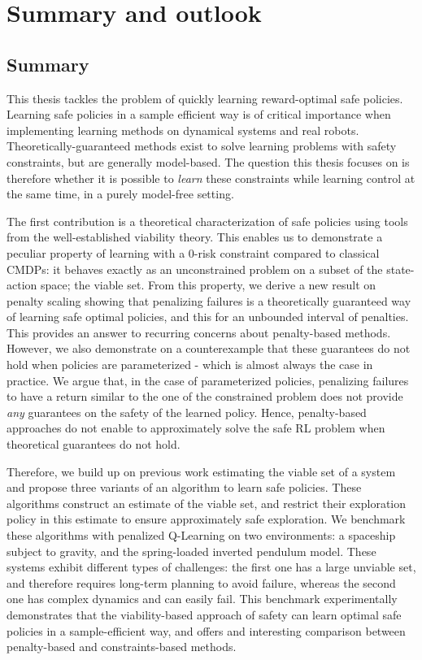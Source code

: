\chapter{Summary and outlook}

\section{Summary} \label{sec:summary}
This thesis tackles the problem of quickly learning reward-optimal safe policies. Learning safe policies in a sample efficient way is of critical importance when implementing learning methods on dynamical systems and real robots. Theoretically-guaranteed methods exist to solve learning problems with safety constraints, but are generally model-based. The question this thesis focuses on is therefore whether it is possible to\emph{ learn} these constraints while learning control at the same time, in a purely model-free setting.\par
The first contribution is a theoretical characterization of safe policies using tools from the well-established viability theory. This enables us to demonstrate a peculiar property of learning with a $0$-risk constraint compared to classical CMDPs: it  behaves exactly as an unconstrained problem on a subset of the state-action space; the viable set. From this property, we derive a new result on penalty scaling showing that penalizing failures is a theoretically guaranteed way of learning safe optimal policies, and this for an unbounded interval of penalties. This provides an answer to recurring concerns about penalty-based methods. However, we also demonstrate on a counterexample that these guarantees do not hold when policies are parameterized - which is almost always the case in practice. We argue that, in the case of parameterized policies, penalizing failures to have a return similar to the one of the constrained problem does not provide\emph{ any} guarantees on the safety of the learned policy. Hence, penalty-based approaches do not enable to approximately solve the safe RL problem when theoretical guarantees do not hold.\par
Therefore, we build up on previous work estimating the viable set of a system and propose three variants of an algorithm to learn safe policies. These algorithms construct an estimate of the viable set, and restrict their exploration policy in this estimate to ensure approximately safe exploration. We benchmark these algorithms with penalized Q-Learning on two environments: a spaceship subject to gravity, and the spring-loaded inverted pendulum model. These systems exhibit different types of challenges: the first one has a large unviable set, and therefore requires long-term planning to avoid failure, whereas the second one has complex dynamics and can easily fail. This benchmark experimentally demonstrates that the viability-based approach of safety can learn optimal safe policies in a sample-efficient way, and offers and interesting comparison between penalty-based and constraints-based methods.\par

